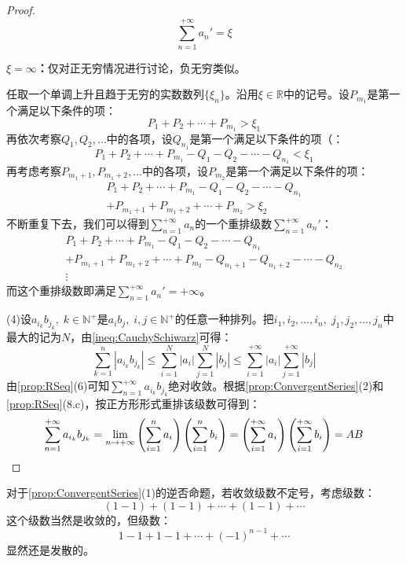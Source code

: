 \begin{proof}
\begin{equation*}
		\sum_{n=1}^{+\infty}a_n'=\xi
	\end{equation*}\par
	\textbf{$\xi=\infty$：}仅对正无穷情况进行讨论，负无穷类似。\par
	任取一个单调上升且趋于无穷的实数数列$\{\xi_n\}$。沿用$\xi\in\mathbb{R}$中的记号。设$P_{m_1}$是第一个满足以下条件的项：
	\begin{equation*}
		P_1+P_2+\cdots+P_{m_1}>\xi_1
	\end{equation*}
	再依次考察$Q_1,Q_2,\dots$中的各项，设$Q_{n_1}$是第一个满足以下条件的项（：
	\begin{equation*}
		P_1+P_2+\cdots+P_{m_1}-Q_1-Q_2-\cdots-Q_{n_1}<\xi_1
	\end{equation*}
	再考虑考察$P_{m_1+1},P_{m_1+2},\dots$中的各项，设$P_{m_2}$是第一个满足以下条件的项：
	\begin{gather*}
		P_1+P_2+\cdots+P_{m_1}-Q_1-Q_2-\cdots-Q_{n_1} \\
		+P_{m_1+1}+P_{m_1+2}+\cdots+P_{m_2}>\xi_2
	\end{gather*}
	不断重复下去，我们可以得到$\sum\limits_{n=1}^{+\infty}a_n$的一个重排级数$\sum\limits_{n=1}^{+\infty}a_n'$：
	\begin{gather*}
		P_1+P_2+\cdots+P_{m_1}-Q_1-Q_2-\cdots-Q_{n_1} \\
		+P_{m_1+1}+P_{m_1+2}+\cdots+P_{m_2}-Q_{n_1+1}-Q_{n_1+2}-\cdots-Q_{n_2} \\
		\vdots
	\end{gather*}
	而这个重排级数即满足$\sum\limits_{n=1}^{+\infty}a_n'=+\infty$。\par
	(4)设$a_{i_k}b_{j_k},\;k\in\mathbb{N}^+$是$a_ib_j,\;i,j\in\mathbb{N}^+$的任意一种排列。把$i_1,i_2,\dots,i_n,\;j_1,j_2,\dots,j_n$中最大的记为$N$，由\cref{ineq:CauchySchiwarz}可得：
	\begin{equation*}
		\sum_{k=1}^n|a_{i_k}b_{j_k}|\leqslant\sum_{i=1}^N|a_i|\sum_{j=1}^N|b_j|\leqslant\sum_{i=1}^{+\infty}|a_i|\sum_{j=1}^{+\infty}|b_j|
	\end{equation*}
	由\cref{prop:RSeq}(6)可知$\sum\limits_{n=1}^{+\infty}a_{i_k}b_{j_k}$绝对收敛。根据\cref{prop:ConvergentSeries}(2)和\cref{prop:RSeq}(8.c)，按正方形形式重排该级数可得到：
	\begin{equation*}
		\sum_{n=1}^{+\infty}a_{i_k}b_{j_k}=\lim_{n\to+\infty}\left(\sum_{i=1}^na_i\right)\left(\sum_{i=1}^nb_i\right)=\left(\sum_{i=1}^{+\infty}a_i\right)\left(\sum_{i=1}^{+\infty}b_i\right)=AB\qedhere
	\end{equation*}
\end{proof}
\begin{note}
	对于\cref{prop:ConvergentSeries}(1)的逆否命题，若收敛级数不定号，考虑级数：
	\begin{equation*}
		(1-1)+(1-1)+\cdots+(1-1)+\cdots
	\end{equation*}
	这个级数当然是收敛的，但级数：
	\begin{equation*}
		1-1+1-1+\cdots+(-1)^{n-1}+\cdots
	\end{equation*}
	显然还是发散的。
\end{note}